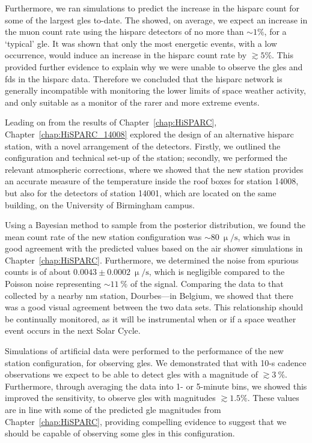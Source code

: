 Furthermore, we ran simulations to predict the increase in the \gls{hisparc} count for some of the largest \glspl{gle} to-date. The showed, on average, we expect an increase in the muon count rate using the \gls{hisparc} detectors of no more than $\sim 1\%$, for a `typical' \gls{gle}. It was shown that only the most energetic events, with a low occurrence, would induce an increase in the \gls{hisparc} count rate by $\gtrsim5\%$. This provided further evidence to explain why we were unable to observe the \glspl{gle} and \glspl{fd} in the \gls{hisparc} data. Therefore we concluded that the \gls{hisparc} network is generally incompatible with monitoring the lower limits of space weather activity, and only suitable as a monitor of the rarer and more extreme events.


Leading on from the results of Chapter~\ref{chap:HiSPARC}, Chapter~\ref{chap:HiSPARC_14008} explored the design of an alternative \gls{hisparc} station, with a novel arrangement of the detectors. Firstly, we outlined the configuration and technical set-up of the station; secondly, we performed the relevant atmospheric corrections, where we showed that the new station provides an accurate measure of the temperature inside the roof boxes for station 14008, but also for the detectors of station 14001, which are located on the same building, on the University of Birmingham campus.

Using a Bayesian method to sample from the posterior distribution, we found the mean count rate of the new station configuration was $\sim80~\upmu/\mathrm{s}$, which was in good agreement with the predicted values based on the air shower simulations in Chapter~\ref{chap:HiSPARC}. Furthermore, we determined the noise from spurious counts is of about $0.0043\pm0.0002~\upmu/\mathrm{s}$, which is negligible compared to the Poisson noise representing $\sim11~\%$ of the signal. Comparing the data to that collected by a nearby \gls{nm} station, Dourbes---in Belgium, we showed that there was a good visual agreement between the two data sets. This relationship should be continually monitored, as it will be instrumental when or if a space weather event occurs in the next Solar Cycle.

Simulations of artificial data were performed to the performance of the new station configuration, for observing \glspl{gle}. We demonstrated that with 10-s cadence observations we expect to be able to detect \glspl{gle} with a magnitude of $\gtrsim3~\%$. Furthermore, through averaging the data into 1- or 5-minute bins, we showed this improved the sensitivity, to observe \glspl{gle} with magnitudes $\gtrsim1.5 \%$. These values are in line with some of the predicted \gls{gle} magnitudes from Chapter~\ref{chap:HiSPARC}, providing compelling evidence to suggest that we should be capable of observing some \glspl{gle} in this configuration.

